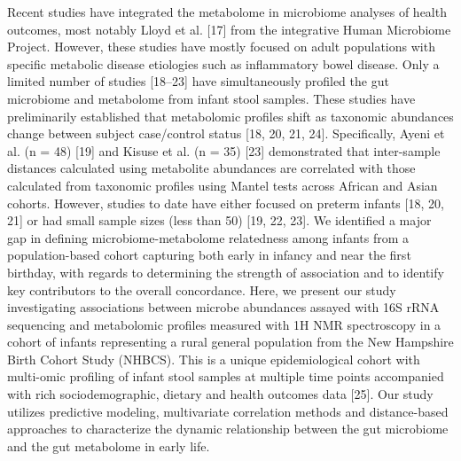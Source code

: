 Recent studies have integrated the metabolome in microbiome analyses of health outcomes, most notably Lloyd et al. [17] from the integrative Human Microbiome Project. However, these studies have mostly focused on adult populations with specific metabolic disease etiologies such as inflammatory bowel disease. Only a limited number of studies [18–23] have simultaneously profiled the gut microbiome and metabolome from infant stool samples. These studies have preliminarily established that metabolomic profiles shift as taxonomic abundances change between subject case/control status [18, 20, 21, 24]. Specifically, Ayeni et al. (n = 48) [19] and Kisuse et al. (n = 35) [23] demonstrated that inter-sample distances calculated using metabolite abundances are correlated with those calculated from taxonomic profiles using Mantel tests across African and Asian cohorts. However, studies to date have either focused on preterm infants [18, 20, 21] or had small sample sizes (less than 50) [19, 22, 23]. We identified a major gap in defining microbiome-metabolome relatedness among infants from a population-based cohort capturing both early in infancy and near the first birthday, with regards to determining the strength of association and to identify key contributors to the overall concordance. 
Here, we present our study investigating associations between microbe abundances assayed with 16S rRNA sequencing and metabolomic profiles measured with 1H NMR spectroscopy in a cohort of infants representing a rural general population from the New Hampshire Birth Cohort Study (NHBCS). This is a unique epidemiological cohort with multi-omic profiling of infant stool samples at multiple time points accompanied with rich sociodemographic, dietary and health outcomes data  [25]. Our study utilizes predictive modeling, multivariate correlation methods and distance-based approaches to characterize the dynamic relationship between the gut microbiome and the gut metabolome in early life. 
